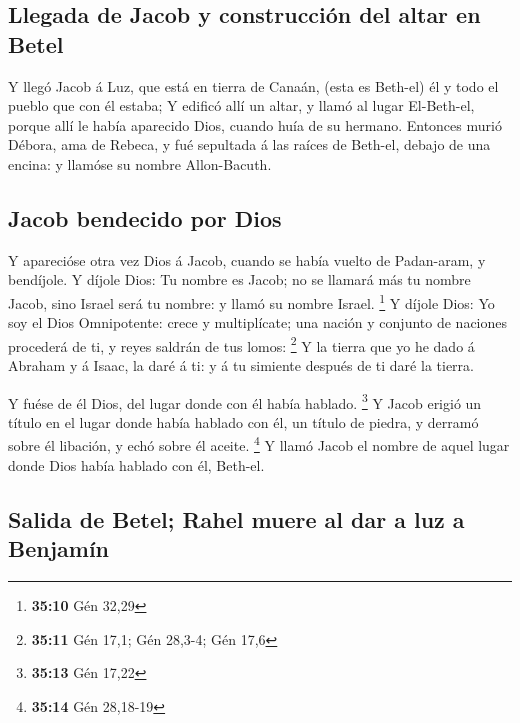 \hypertarget{llegada-de-jacob-y-construcciuxf3n-del-altar-en-betel}{%
\subsection{Llegada de Jacob y construcción del altar en
Betel}\label{llegada-de-jacob-y-construcciuxf3n-del-altar-en-betel}}

 Y llegó Jacob á Luz, que está en tierra de Canaán, (esta es
Beth-el) él y todo el pueblo que con él estaba;  Y edificó
allí un altar, y llamó al lugar El-Beth-el, porque allí le había
aparecido Dios, cuando huía de su hermano.  Entonces murió
Débora, ama de Rebeca, y fué sepultada á las raíces de Beth-el, debajo
de una encina: y llamóse su nombre Allon-Bacuth.

\hypertarget{jacob-bendecido-por-dios}{%
\subsection{Jacob bendecido por Dios}\label{jacob-bendecido-por-dios}}

 Y aparecióse otra vez Dios á Jacob, cuando se había vuelto
de Padan-aram, y bendíjole.  Y díjole Dios: Tu nombre es
Jacob; no se llamará más tu nombre Jacob, sino Israel será tu nombre: y
llamó su nombre Israel. \footnote{\textbf{35:10} Gén 32,29}
 Y díjole Dios: Yo soy el Dios Omnipotente: crece y
multiplícate; una nación y conjunto de naciones procederá de ti, y reyes
saldrán de tus lomos: \footnote{\textbf{35:11} Gén 17,1; Gén 28,3-4; Gén
  17,6}  Y la tierra que yo he dado á Abraham y á Isaac, la
daré á ti: y á tu simiente después de ti daré la tierra.

 Y fuése de él Dios, del lugar donde con él había hablado.
\footnote{\textbf{35:13} Gén 17,22}  Y Jacob erigió un
título en el lugar donde había hablado con él, un título de piedra, y
derramó sobre él libación, y echó sobre él aceite. \footnote{\textbf{35:14}
  Gén 28,18-19}  Y llamó Jacob el nombre de aquel lugar
donde Dios había hablado con él, Beth-el.

\hypertarget{salida-de-betel-rahel-muere-al-dar-a-luz-a-benjamuxedn}{%
\subsection{Salida de Betel; Rahel muere al dar a luz a
Benjamín}\label{salida-de-betel-rahel-muere-al-dar-a-luz-a-benjamuxedn}}

